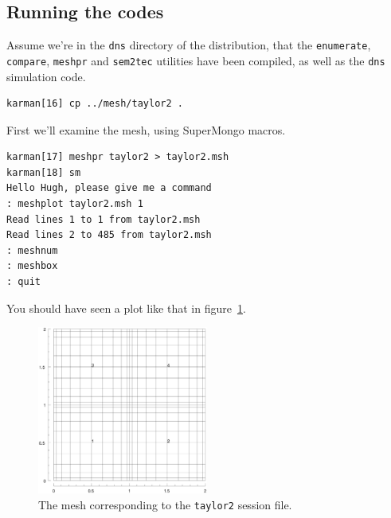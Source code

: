 \documentclass[11pt,a4paper]{report}
\begin{document}
\subsection{Running the codes}

Assume we're in the \texttt{dns} directory of the distribution, that
the \texttt{enumerate}, \texttt{compare}, \texttt{meshpr} and
\texttt{sem2tec} utilities have been compiled, as well as the
\texttt{dns} simulation code.
{\small
\begin{verbatim}
karman[16] cp ../mesh/taylor2 .
\end{verbatim}
}

First we'll examine the mesh, using SuperMongo macros.
{\small
\begin{verbatim}
karman[17] meshpr taylor2 > taylor2.msh
karman[18] sm
Hello Hugh, please give me a command
: meshplot taylor2.msh 1
Read lines 1 to 1 from taylor2.msh
Read lines 2 to 485 from taylor2.msh
: meshnum
: meshbox
: quit
\end{verbatim}
}
\noindent
You should have seen a plot like that in figure~\ref{tay2msh}.
\begin{figure}
\begin{center}
\includegraphics[width=0.5\textwidth]{taylor2mesh.eps}
\end{center}
\caption{
\label{tay2msh}
  The mesh corresponding to the \texttt{taylor2} session file.
}
\end{figure}
\end{document}
